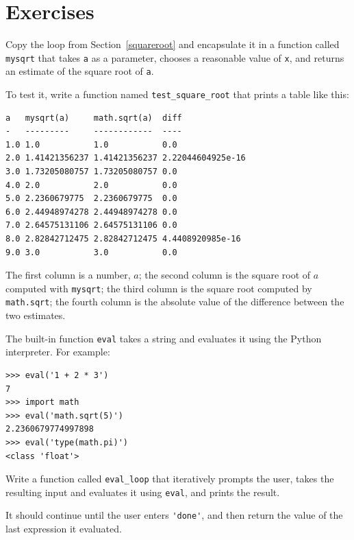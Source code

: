 \documentclass[10pt]{book}
\begin{document}
\section{Exercises}

\begin{exercise}

Copy the loop from Section~\ref{squareroot}
and encapsulate it in a function called
\verb"mysqrt" that takes {\tt a} as a parameter, chooses a
reasonable value of {\tt x}, and returns an estimate of the square
root of {\tt a}.  

To test it, write a function named \verb"test_square_root"
that prints a table like this:

\begin{verbatim}
a   mysqrt(a)     math.sqrt(a)  diff
-   ---------     ------------  ----
1.0 1.0           1.0           0.0
2.0 1.41421356237 1.41421356237 2.22044604925e-16
3.0 1.73205080757 1.73205080757 0.0
4.0 2.0           2.0           0.0
5.0 2.2360679775  2.2360679775  0.0
6.0 2.44948974278 2.44948974278 0.0
7.0 2.64575131106 2.64575131106 0.0
8.0 2.82842712475 2.82842712475 4.4408920985e-16
9.0 3.0           3.0           0.0
\end{verbatim}
%
The first column is a number, $a$; the second column is the square
root of $a$ computed with \verb"mysqrt"; the third column is the
square root computed by {\tt math.sqrt}; the fourth column is the
absolute value of the difference between the two estimates.
\end{exercise}


\begin{exercise}

The built-in function {\tt eval} takes a string and evaluates
it using the Python interpreter.  For example:

\begin{verbatim}
>>> eval('1 + 2 * 3')
7
>>> import math
>>> eval('math.sqrt(5)')
2.2360679774997898
>>> eval('type(math.pi)')
<class 'float'>
\end{verbatim}
%
Write a function called \verb"eval_loop" that iteratively
prompts the user, takes the resulting input and evaluates
it using {\tt eval}, and prints the result.

It should continue until the user enters \verb"'done'", and then
return the value of the last expression it evaluated.

\end{exercise}
\end{document}
